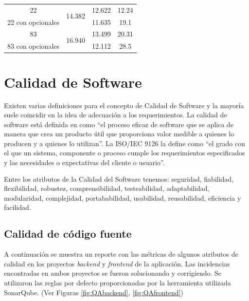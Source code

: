 \begin{table}[tbp]
{\begin{tabular}{cccc}
22                 & \multirow{2}{*}{14.382}                                                           & 12.622                  & 12.24                                                                         \\
22 con opcionales  &                                                                                   & 11.635                  & 19.1                                                                          \\ \hline
83                 & \multirow{2}{*}{16.940}                                                           & 13.499                  & 20.31                                                                         \\
83 con opcionales  &                                                                                   & 12.112                  & 28.5                                                                          \\ \hline
\end{tabular}%
}
\end{table}

\section{Calidad de Software}

Existen varias definiciones para el concepto de Calidad de Software y la mayoría suele coincidir en la idea de adecuación a los requerimientos. La calidad de software está definida en \citet{Pressman2010IngenieriaPractico} como ``el proceso eficaz de software que se aplica de manera que crea un producto útil que proporciona valor medible a quienes lo producen y a quienes lo utilizan''. La ISO/IEC 9126 la define como ``el grado con el que un sistema, componente o proceso cumple los requerimientos especificados y las necesidades o expectativas del cliente o usuario''. 

Entre los atributos de la Calidad del Software tenemos: seguridad, fiabilidad, flexibilidad, robustez, comprensibilidad, testeabilidad, adaptabilidad, modularidad, complejidad, portababilidad, usabilidad, reusabilidad, eficiencia y facilidad.

\subsection{Calidad de código fuente}

A continuación se muestra un reporte con las métricas de algunos atributos de calidad en los proyectos \textit{backend} y \textit{frontend} de la aplicación. Las incidencias encontradas en ambos proyectos se fueron solucionando y corrigiendo. Se utilizaron las reglas por defecto proporcionadas por la herramienta utilizada SonarQube. (Ver Figuras \ref{fig:QAbackend}, \ref{fig:QAfrontend})

